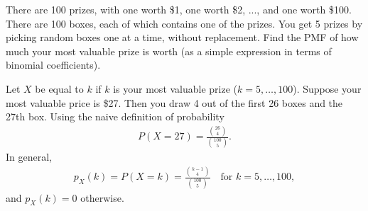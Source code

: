 
\setcounter{theorem}{3}

\begin{exercise}[BH.3.8]
  There are 100 prizes, with one worth \$1, one worth \$2, ..., and one worth \$100. There are 100 boxes, each of which contains one of the prizes. You get 5 prizes by picking random boxes one at a time, without replacement. Find the PMF of how much your most valuable prize is worth (as a simple expression in terms of binomial coefficients).
\begin{solution}
	Let $X$ be equal to $k$ if $k$ is your most valuable prize ($k=5,\ldots,100$). Suppose your most valuable price is \$27. Then you draw 4 out of the first 26 boxes and the 27th box. Using the naive definition of probability
	\begin{align*}
		P(X=27) = \frac{{26\choose 4}}{{100 \choose 5}}.
	\end{align*}
	In general,
	\begin{align*}
		p_{X}(k) = P(X=k) = \frac{{k-1\choose 4}}{{100 \choose 5}}\quad \text{for } k=5,\ldots,100,
	\end{align*}
	and $p_{X}(k)=0$ otherwise.
\end{solution}
\end{exercise}


